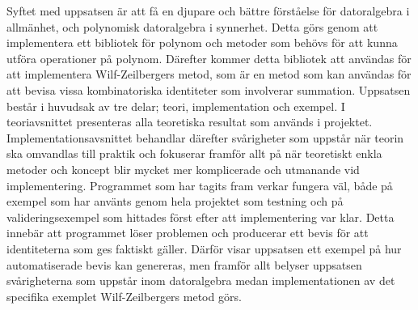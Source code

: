 Syftet med uppsatsen är att få en djupare och bättre förståelse för datoralgebra i allmänhet, och polynomisk datoralgebra i synnerhet. Detta görs genom att implementera ett bibliotek för polynom och metoder som behövs för att kunna utföra operationer på polynom. Därefter kommer detta bibliotek att användas för att implementera Wilf-Zeilbergers metod, som är en metod som kan användas för att bevisa vissa kombinatoriska identiteter som involverar summation. Uppsatsen består i huvudsak av tre delar; teori, implementation och exempel. I teoriavsnittet presenteras alla teoretiska resultat som används i projektet. Implementationsavsnittet behandlar därefter svårigheter som uppstår när teorin ska omvandlas till praktik och fokuserar framför allt på när teoretiskt enkla metoder och koncept blir mycket mer komplicerade och utmanande vid implementering. Programmet som har tagits fram verkar fungera väl, både på exempel som har använts genom hela projektet som testning och på valideringsexempel som hittades först efter att implementering var klar. Detta innebär att programmet löser problemen och producerar ett bevis för att identiteterna som ges faktiskt gäller. Därför visar uppsatsen ett exempel på hur automatiserade bevis kan genereras, men framför allt belyser uppsatsen svårigheterna som uppstår inom datoralgebra medan implementationen av det specifika exemplet Wilf-Zeilbergers metod görs.
